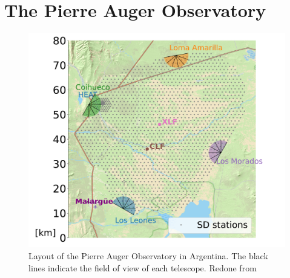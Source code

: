 
\chapter{The Pierre Auger Observatory}
\label{chap:setup}
\begin{figure}[h!]
\centering
\includegraphics[width=\textwidth]{thesis_figures/Setup/map_srij_version.pdf}
\caption{Layout of the Pierre Auger Observatory in Argentina. The black lines indicate the field of view of each telescope. Redone from~\cite{Jannis_thesis} }
\label{fig:Auger_map}
\end{figure}

